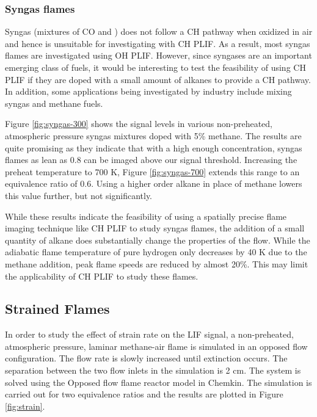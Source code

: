 

\subsubsection{Syngas flames}

Syngas (mixtures of CO and ) does not follow a CH pathway when oxidized in air and hence is unsuitable for investigating with CH PLIF.
As a result, most syngas flames are investigated using OH PLIF.
However, since syngases are an important emerging class of fuels, it would be interesting to test the feasibility of using CH PLIF if they are doped with a small amount of alkanes to provide a CH pathway. In addition, some applications being investigated by industry include mixing syngas and methane fuels.

Figure \ref{fig:syngas-300} shows the signal levels in various non-preheated, atmospheric pressure syngas mixtures doped with 5\% methane.
The results are quite promising as they indicate that with a high enough  concentration, syngas flames as lean as 0.8 can be imaged above our signal threshold.
Increasing the preheat temperature to 700 K, Figure \ref{fig:syngas-700} extends this range to an equivalence ratio of 0.6.
Using a higher order alkane in place of methane lowers this value further, but not significantly.



While these results indicate the feasibility of using a spatially precise flame imaging technique like CH PLIF to study syngas flames, the addition of a small quantity of alkane does substantially change the properties of the flow.
While the adiabatic flame temperature of pure hydrogen only decreases by 40 K due to the methane addition, peak flame speeds are reduced by almost 20\%.
This may limit the applicability of CH PLIF to study these flames.

\subsection{Strained Flames}

In order to study the effect of strain rate on the LIF signal, a non-preheated, atmospheric pressure, laminar methane-air flame is simulated in an opposed flow configuration.
The flow rate is slowly increased until extinction occurs.
The separation between the two flow inlets in the simulation is 2 cm.
The system is solved using the Opposed flow flame reactor model in Chemkin.
The simulation is carried out for two equivalence ratios and the results are plotted in Figure \ref{fig:strain}.

